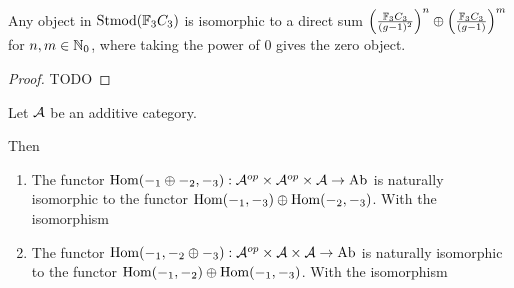 \begin{theorem}
    Any object in \( \operatorname{Stmod}({\mathbb{F}}_3C_3) \) is isomorphic to a direct sum \( \left( \frac{{\mathbb{F}}_3C_3}{(g - 1)^2} \right)^n \oplus \left( \frac{{\mathbb{F}}_3C_3}{(g - 1)} \right)^m \) for \( n, m \in {\mathbb{N}}_0 \), where taking the power of \( 0 \) gives the zero object. \sloppy
\end{theorem}
\begin{proof}
    TODO
\end{proof}

\begin{theorem} %
    Let \( {\mathcal{A}} \) be an additive category.
    
    Then 
    \begin{enumerate}
        \item {
            The functor \( \operatorname{Hom}(-_1 \oplus -_2, -_3): {\mathcal{A}}^{op} \times {\mathcal{A}}^{op} \times {\mathcal{A}} \to \operatorname{Ab} \) is naturally isomorphic to the functor \( \operatorname{Hom}(-_1, -_3) \oplus \operatorname{Hom}(-_2, -_3) \). With the isomorphism

            \begin{center}
            \end{center}
        }
        \item {
            The functor \( \operatorname{Hom}(-_1, -_2 \oplus -_3): {\mathcal{A}}^{op} \times {\mathcal{A}} \times {\mathcal{A}} \to \operatorname{Ab} \) is naturally isomorphic to the functor \( \operatorname{Hom}(-_1, -_2) \oplus \operatorname{Hom}(-_1, -_3) \). With the isomorphism

            \begin{center}
\end{center}}
\end{enumerate}
\end{theorem}
